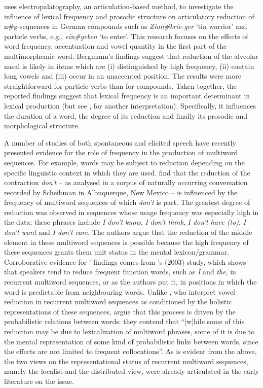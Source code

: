 \citet{bergmann2012} uses electropalatography, an articulation-based method, to investigate the influence of lexical frequency and prosodic structure on articulatory reduction of n\#g-sequences in German compounds such as \textit{Zinn\#krie-ger} `tin warrior' and particle verbs, e.g., \textit{ein\#geben} `to enter'. This research focuses on the effects of word frequency, accentuation and vowel quantity in the first part of the multimorphemic word. Bergmann's findings suggest that reduction of the alveolar nasal is likely in items which are (i) distinguished by high frequency, (ii) contain long vowels and (iii) occur in an unaccented position. The results were more straightforward for particle verbs than for compounds. Taken together, the reported findings suggest that lexical frequency is an important determinant in lexical production (but see  \citealt{jurafsky2003}, for another interpretation). Specifically, it influences the duration of a word, the degree of its reduction and finally its prosodic and morphological  structure.

A number of studies of both spontaneous and elicited speech have recently presented evidence for the role of frequency in the production of multiword sequences. For example, words may be subject to reduction depending on the specific linguistic context in which they are used. \citet{bybee-scheibman} find that the reduction of the contraction \textit{don't} -- as analysed in a corpus of naturally occurring conversation recorded by Scheibman in Albuquerque, New Mexico -- is influenced by the frequency of multiword sequences of which \textit{don't} is part. The greatest degree of reduction was observed in sequences whose usage frequency was especially high in the data; these phrases include \textit{I don't know}, \textit{I don't think}, \textit{I don't have (to)}, \textit{I don't want} and \textit{I don't care}. The authors argue that the reduction of the middle element in these multiword sequences is possible because the high frequency of these sequences grants them unit status in the mental lexicon/grammar.
Corroborative evidence for \citeauthor{bybee-scheibman}' findings comes from \citeauthor{bell-etal2003}'s (2003) study, which shows that speakers tend to reduce frequent function words, such as \textit{I} and \textit{the}, in recurrent multiword sequences, or as the authors put it, in positions in which the word is predictable from neighbouring words. Unlike \citet{bybee-scheibman}, who interpret vowel reduction in recurrent multiword sequences as conditioned by the holistic representations of these sequences, \citet[][1021]{bell-etal2003} argue that this process is driven by the probabilistic relations between words: they contend that ``[w]hile some of this reduction may be due to lexicalization of multiword phrases, some of it is due to the mental representation of some kind of probabilistic links between words, since the effects are not limited to frequent collocations''. As is evident from the above, the two views on the representational status of recurrent multiword sequences, namely the localist and the distributed view, were already articulated in the early literature on the issue. 

